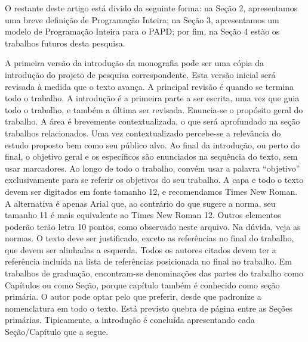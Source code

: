 O restante deste artigo está divido da seguinte forma: na Seção 2, apresentamos uma breve definição de Programação Inteira; na Seção 3, apresentamos um modelo de Programação Inteira para o PAPD; por fim, na Seção 4 estão os trabalhos futuros desta pesquisa.

A primeira versão da introdução da monografia pode ser uma cópia da introdução do projeto de pesquisa correspondente. Esta versão inicial será revisada à medida que o texto avança. A principal revisão é quando se termina todo o trabalho. A introdução é a primeira parte a ser escrita, uma vez que guia todo o trabalho, e também a última ser revisada.
Enuncia-se o propósito geral do trabalho. A área é brevemente contextualizada, o que será aprofundado na seção trabalhos relacionados. Uma vez contextualizado percebe-se a relevância do estudo proposto bem como seu público alvo.
Ao final da introdução, ou perto do final, o objetivo geral e os específicos são enunciados na sequência do texto, sem usar marcadores. Ao longo de todo o trabalho, convém usar a palavra “objetivo” exclusivamente para se referir os objetivos do seu trabalho.
A capa e todo o texto devem ser digitados em fonte tamanho 12, e recomendamos Times New Roman. A alternativa é apenas Arial que, ao contrário do que sugere a norma, seu tamanho 11 é mais equivalente ao Times New Roman 12. Outros elementos poderão terão letra 10 pontos, como observado neste arquivo. Na dúvida, veja as normas. O texto deve ser justificado, exceto as referências no final do trabalho, que devem ser alinhadas a esquerda.
Todos os autores citados devem ter a referência incluída na lista de referências posicionada no final no trabalho.
Em trabalhos de graduação, encontram-se denominações das partes do trabalho como Capítulos ou como Seção, porque capítulo também é conhecido como seção primária. O autor pode optar pelo que preferir, desde que padronize a nomenclatura em todo o texto. Está previsto quebra de página entre as Seções primárias.
Tipicamente, a introdução é concluída apresentando cada Seção/Capítulo que a segue.
